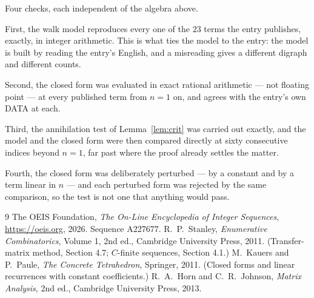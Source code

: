 \documentclass[11pt,a4paper]{article}
\theoremstyle{plain}
\theoremstyle{definition}
\begin{document}
Four checks, each independent of the algebra above.

First, the walk model reproduces every one of the $23$ terms the entry publishes,
exactly, in integer arithmetic. This is what ties the model to the entry: the model is built
by reading the entry's English, and a misreading gives a different digraph and different
counts.

Second, the closed form was evaluated in exact rational arithmetic --- not floating point ---
at every published term from $n=1$ on, and agrees with the entry's own DATA at each.

Third, the annihilation test of Lemma~\ref{lem:crit} was carried out exactly, and the model
and the closed form were then compared directly at sixty consecutive indices beyond
$n=1$, far past where the proof already settles the matter.

Fourth, the closed form was deliberately perturbed --- by a constant and by a term linear in
$n$ --- and each perturbed form was rejected by the same comparison, so the test is not one
that anything would pass.

\begin{thebibliography}{9}
 The OEIS Foundation, \emph{The On-Line Encyclopedia of Integer
Sequences}, \url{https://oeis.org}, 2026. Sequence A227677.
 R.~P.~Stanley, \emph{Enumerative Combinatorics}, Volume 1, 2nd ed.,
Cambridge University Press, 2011. (Transfer-matrix method, Section 4.7; $C$-finite sequences,
Section 4.1.)
 M.~Kauers and P.~Paule, \emph{The Concrete Tetrahedron}, Springer, 2011.
(Closed forms and linear recurrences with constant coefficients.)
 R.~A.~Horn and C.~R.~Johnson, \emph{Matrix Analysis}, 2nd ed., Cambridge
University Press, 2013.
\end{thebibliography}
\end{document}
